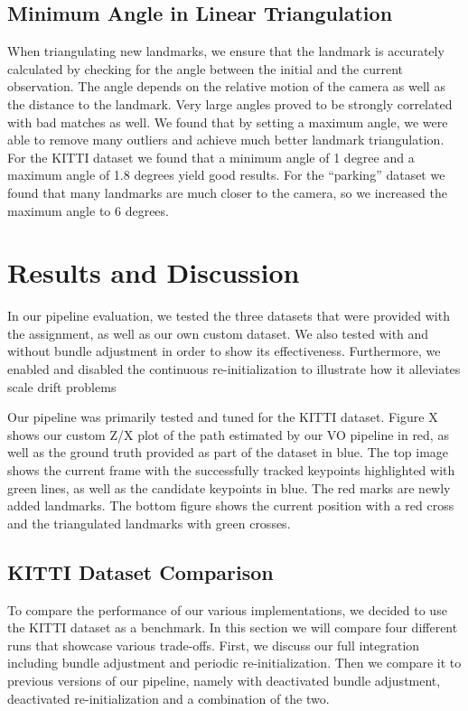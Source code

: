 \documentclass[11pt]{article}
\begin{document}
\subsection{Minimum Angle in Linear Triangulation}
When triangulating new landmarks, we ensure that the landmark is accurately calculated by checking for the angle between the initial and the current observation. The angle depends on the relative motion of the camera as well as the distance to the landmark.
Very large angles proved to be strongly correlated with bad matches as well. We found that by setting a maximum angle, we were able to remove many outliers and achieve much better landmark triangulation. 
For the KITTI dataset we found that a minimum angle of 1 degree and a maximum angle of 1.8 degrees  yield good results. For the “parking” dataset we found that many landmarks are much closer to the camera, so we increased the maximum angle to 6 degrees.



\section{Results and Discussion}
In our pipeline evaluation, we tested the three datasets that were provided with the assignment, as well as our own custom dataset. We also tested with and without bundle adjustment in order to show its effectiveness. Furthermore, we enabled and disabled the continuous re-initialization to illustrate how it alleviates scale drift problems

Our pipeline was primarily tested and tuned for the KITTI dataset. Figure X shows our custom Z/X plot of the path estimated by our VO pipeline in red, as well as the ground truth provided as part of the dataset in blue. The top image shows the current frame with the successfully tracked keypoints highlighted with green lines, as well as the candidate keypoints in blue. The red marks are newly added landmarks. The bottom figure shows the current position with a red cross and the triangulated landmarks with green crosses.

\subsection{KITTI Dataset Comparison}
To compare the performance of our various implementations, we decided to use the KITTI dataset as a benchmark. In this section we will compare four different runs that showcase various trade-offs. First, we discuss our full integration including bundle adjustment and periodic re-initialization. Then we compare it to previous versions of our pipeline, namely with deactivated bundle adjustment, deactivated re-initialization and a combination of the two.
\end{document}
